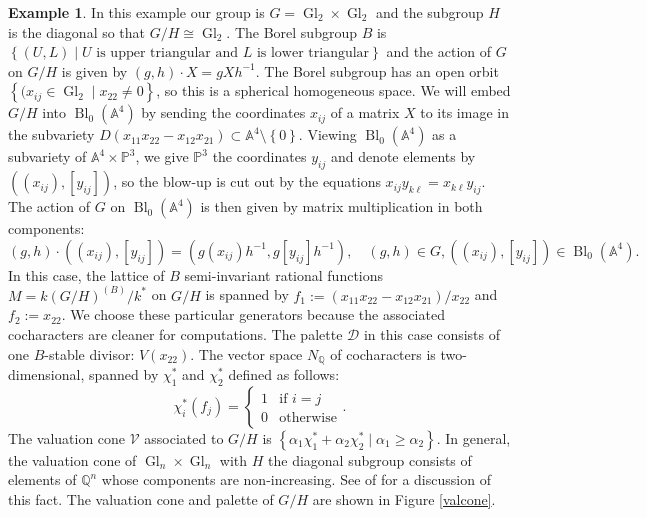 \documentclass[12pt,twoside,cd]{amsart}
\theoremstyle{definition}
\newtheorem{example}[theorem]{Example}
\begin{document}
\begin{example}
In this example our group is $G = {\operatorname{Gl}}_2 \times {\operatorname{Gl}}_2$ and the subgroup $H$ is the diagonal so that $G/H \cong {\operatorname{Gl}}_2$. The Borel subgroup $B$ is ${\left\lbrace {(U,L) \mid U \text{ is upper triangular and } L \text{ is lower triangular}} \right\rbrace}$ and the action of $G$ on $G/H$ is given by $(g,h) \cdot X = gXh^{-1}$.
The Borel subgroup has an open orbit ${\left\lbrace {(x_{ij} \in {\operatorname{Gl}}_2 \mid x_{22} \neq 0} \right\rbrace}$, so this is a spherical homogeneous space.
We will embed $G/H$ into ${\operatorname{Bl}}_0(\mathbb{A}^4)$ by sending the coordinates $x_{ij}$ of a matrix $X$ to its image in the subvariety $D(x_{11}x_{22} - x_{12}x_{21}) \subset \mathbb{A}^4 \setminus {\left\lbrace {0} \right\rbrace}$.
Viewing ${\operatorname{Bl}}_0(\mathbb{A}^4)$ as a subvariety of $\mathbb{A}^4 \times \mathbb{P}^3$, we give $\mathbb{P}^3$ the coordinates $y_{ij}$ and denote elements by $((x_{ij}),[y_{ij}])$, so the blow-up is cut out by the equations $x_{ij}y_{k\ell} = x_{k\ell}y_{ij}$.
The action of $G$ on ${\operatorname{Bl}}_0(\mathbb{A}^4)$ is then given by matrix multiplication in both components:
\[
(g,h) \cdot ((x_{ij}),[y_{ij}]) = (g(x_{ij})h^{-1},g[y_{ij}]h^{-1}), \quad (g,h) \in G, ((x_{ij}),[y_{ij}]) \in {\operatorname{Bl}}_0(\mathbb{A}^4).
\]
In this case, the lattice of $B$ semi-invariant rational functions $M = k(G/H)^{(B)}/k^*$ on $G/H$ is spanned by $f_1 := (x_{11}x_{22} - x_{12}x_{21})/x_{22}$ and $f_2 := x_{22}$. We choose these particular generators because the associated cocharacters are cleaner for computations.
The palette $\mathcal{D}$ in this case consists of one $B$-stable divisor: $V(x_{22})$.
The vector space $N_\mathbb{Q}$ of cocharacters is two-dimensional, spanned by $\chi_1^*$ and $\chi_2^*$ defined as follows:
\[
\chi_{i}^*(f_j) = \left\lbrace \begin{array}{ll}
1 & \text{if $i = j$} \\
0 & \text{otherwise}
\end{array}
\right..
\]
The valuation cone $\mathcal{V}$ associated to $G/H$ is ${\left\lbrace {\alpha_1\chi_1^* + \alpha_2\chi_2^* \mid \alpha_1 \geq \alpha_2} \right\rbrace}$. In general, the valuation cone of ${\operatorname{Gl}}_n \times {\operatorname{Gl}}_n$ with $H$ the diagonal subgroup consists of elements of $\mathbb{Q}^n$ whose components are non-increasing. See  of \cite{Vo} for a discussion of this fact. The valuation cone and palette of $G/H$ are shown in Figure \ref{valcone}.


\end{example}
\end{document}
